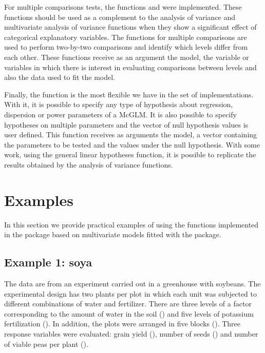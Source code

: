 \documentclass[article]{jss}\usepackage[]{graphicx}\usepackage[]{xcolor}
\begin{document}
For  multiple comparisons tests, the functions  and  were implemented. These functions should be used as a complement to the analysis of variance and multivariate analysis of variance functions when they show a significant effect of categorical explanatory variables. The functions for multiple comparisons are used to perform two-by-two comparisons and identify which levels differ from each other. These functions receive as an argument the model, the variable or variables in which there is interest in evaluating comparisons between levels and also the data used to fit the model.

Finally, the  function is the most flexible we have in the set of implementations. With it, it is possible to specify any type of hypothesis about regression, dispersion or power parameters of a McGLM. It is also possible to specify hypotheses on multiple parameters and the vector of null hypothesis values is user defined. This function receives as arguments the model, a vector containing the parameters to be tested and the values under the null hypothesis. With some work, using the general linear hypotheses function, it is possible to replicate the results obtained by the analysis of variance functions.


\section{Examples}\label{sec:exemplos}

In this section we provide practical examples of using the functions implemented in the  package based on multivariate models fitted with the  package.



\subsection{Example 1: soya}

The data are from an experiment carried out in a greenhouse with soybeans. The experimental design has two plants per plot in which each unit was subjected to different combinations of water and fertilizer. There are three levels of a factor corresponding to the amount of water in the soil () and five levels of potassium fertilization (). In addition, the plots were arranged in five blocks (). Three response variables were evaluated: grain yield (), number of seeds () and number of viable peas per plant ().
\end{document}

